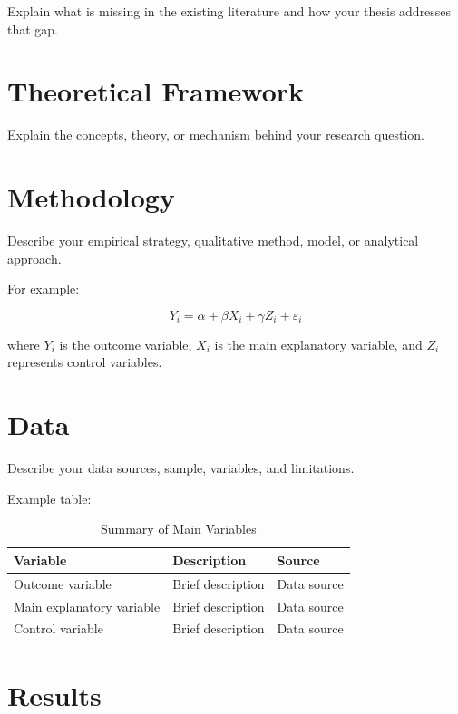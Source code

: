 \documentclass[12pt,a4paper]{article}
\begin{document}
Explain what is missing in the existing literature and how your thesis addresses that gap.

\section{Theoretical Framework}

Explain the concepts, theory, or mechanism behind your research question.

\section{Methodology}

Describe your empirical strategy, qualitative method, model, or analytical approach.

For example:

\begin{equation}
Y_i = \alpha + \beta X_i + \gamma Z_i + \varepsilon_i
\end{equation}

where \(Y_i\) is the outcome variable, \(X_i\) is the main explanatory variable,
and \(Z_i\) represents control variables.

\section{Data}

Describe your data sources, sample, variables, and limitations.

Example table:

\begin{table}[h]
\centering
\caption{Summary of Main Variables}
\begin{tabular}{lll}
\toprule
Variable & Description & Source \\
\midrule
Outcome variable & Brief description & Data source \\
Main explanatory variable & Brief description & Data source \\
Control variable & Brief description & Data source \\
\bottomrule
\end{tabular}
\end{table}

\section{Results}
\end{document}
